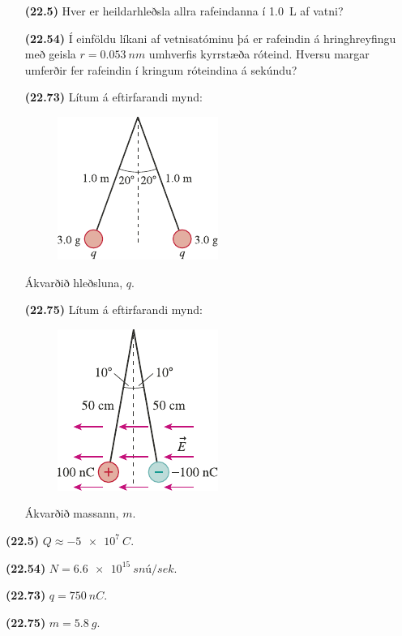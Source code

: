 \ifdefined \wholebook \else\documentclass[oneside]{book}\usepackage{EdlBook}\graphicspath{{figures/}}
\begin{document}
\begin{enumerate}[label = \textbf{(\alph*)}]

\item[\textbf{(22.5)}] Hver er heildarhleðsla allra rafeindanna í \SI{1.0}{L} af vatni?

\item[\textbf{(22.54)}] Í einföldu líkani af vetnisatóminu þá er rafeindin á hringhreyfingu með geisla $r = \SI{0.053}{nm}$ umhverfis kyrrstæða róteind. Hversu margar umferðir fer rafeindin í kringum róteindina á sekúndu?

\item[\textbf{(22.73)}] Lítum á eftirfarandi mynd:

\begin{figure}[H]
    \centering
    \includegraphics{figures/rk2273.pdf}
\end{figure}

Ákvarðið hleðsluna, $q$.

\item[\textbf{(22.75)}] Lítum á eftirfarandi mynd:

\begin{figure}[H]
    \centering
    \includegraphics{figures/rk2275.pdf}
\end{figure}

Ákvarðið massann, $m$.

\end{enumerate}

\begin{tcolorbox}
\begin{enumerate*}[label = \vspace{0.15cm} ]
  \item \textbf{(22.5)} $Q \approx \SI{-5e7}{C}$.
  \item \textbf{(22.54)} $N = \SI{6.6e15}{snú/sek}$.
  \item \textbf{(22.73)} $q = \SI{750}{nC}$.
  \item \textbf{(22.75)} $m = \SI{5.8}{g}$.
\end{enumerate*}
\end{tcolorbox}

\newpage

\ifdefined \wholebook \else
 \printindex
\end{document}
